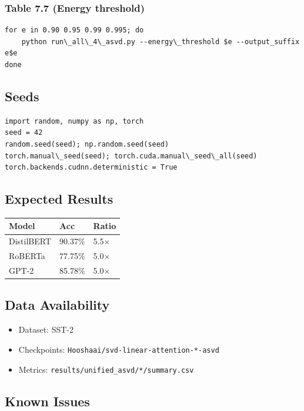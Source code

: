 \subsubsection{Table 7.7 (Energy threshold)}
\begin{lstlisting}
for e in 0.90 0.95 0.99 0.995; do
    python run\_all\_4\_asvd.py --energy\_threshold $e --output_suffix e$e
done
\end{lstlisting}

\subsection{Seeds}

\begin{lstlisting}
import random, numpy as np, torch
seed = 42
random.seed(seed); np.random.seed(seed)
torch.manual\_seed(seed); torch.cuda.manual\_seed\_all(seed)
torch.backends.cudnn.deterministic = True
\end{lstlisting}

\subsection{Expected Results}

\begin{table}[H]
\centering
\small
\begin{tabular}{lll}
\toprule
\textbf{Model} & \textbf{Acc} & \textbf{Ratio} \\
\midrule
DistilBERT & 90.37\% & 5.5$\times$ \\
RoBERTa & 77.75\% & 5.0$\times$ \\
GPT-2 & 85.78\% & 5.0$\times$ \\
\bottomrule
\end{tabular}
\end{table}

\subsection{Data Availability}

\begin{itemize}
\item Dataset: SST-2
\item Checkpoints: \texttt{Hooshaai/svd-linear-attention-*-asvd}
\item Metrics: \texttt{results/unified\_asvd/*/summary.csv}

\end{itemize}
\subsection{Known Issues}

